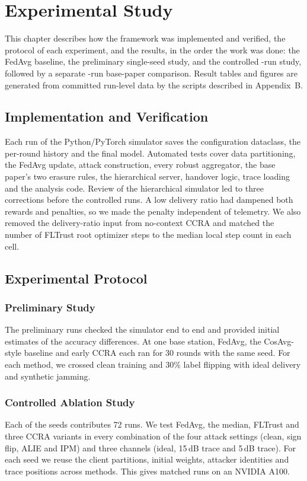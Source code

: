 \chapter{Experimental Study}
\label{ch:results}

This chapter describes how the framework was implemented and verified, the
protocol of each experiment, and the results, in the order the work was done: the
FedAvg baseline, the preliminary single-seed study, and the controlled
\NumRuns-run study, followed by a separate \BpNumRuns-run base-paper comparison.
Result tables and figures are generated from committed run-level data by the
scripts described in Appendix~B.

\section{Implementation and Verification}
Each run of the Python/PyTorch simulator saves the configuration dataclass, the
per-round history and the final model. Automated tests cover data partitioning, the
FedAvg update, attack construction, every robust aggregator, the base paper's two
erasure rules, the hierarchical server, handover logic, trace loading and the
analysis code. Review of the hierarchical simulator led to three corrections
before the controlled runs. A low delivery ratio had dampened both rewards and
penalties, so we made the penalty independent of telemetry. We also removed the
delivery-ratio input from no-context CCRA and matched the number of FLTrust root
optimizer steps to the median local step count in each cell.

\section{Experimental Protocol}
\subsection{Preliminary Study}
The preliminary runs checked the simulator end to end and provided initial
estimates of the accuracy differences. At one base station, FedAvg, the
CosAvg-style baseline and early CCRA each ran for 30 rounds with the same seed.
For each method, we crossed clean training and 30\% label flipping with ideal
delivery and synthetic jamming.

\subsection{Controlled Ablation Study}
\label{sec:protocol}
Each of the \NumSeeds{} seeds contributes 72 runs. We test FedAvg, the median,
FLTrust and three CCRA variants in every combination of the four attack settings
(clean, sign flip, ALIE and IPM) and three channels (ideal, 15\,dB trace and
5\,dB trace). For each seed we reuse the client partitions, initial weights,
attacker identities and trace positions across methods. This gives \NumRuns{}
matched runs on an NVIDIA A100.

